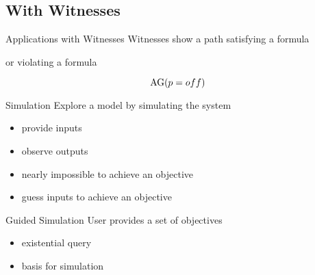 \subsection{With Witnesses} 

\begin{frame}{Applications with Witnesses}
  Witnesses show a path satisfying a formula
  
  \vfill
  
  or violating a formula
  
  \[ \operatorname{AG} (p = off) \]
\end{frame}

\begin{frame}
  \vfill

  \begin{center}
  \end{center}

  \vfill
\end{frame}

\begin{frame}{Simulation}
  Explore a model by simulating the system
  \begin{itemize}
    \item provide inputs 
    \item observe outputs
  \end{itemize}

  \vfill

  \begin{itemize}
    \item nearly impossible to achieve an objective
    \item guess inputs to achieve an objective
  \end{itemize}
\end{frame}

\begin{frame}{Guided Simulation}
  User provides a set of objectives
  \begin{itemize}
    \item existential query
    \item basis for simulation
  \end{itemize}
\end{frame}

